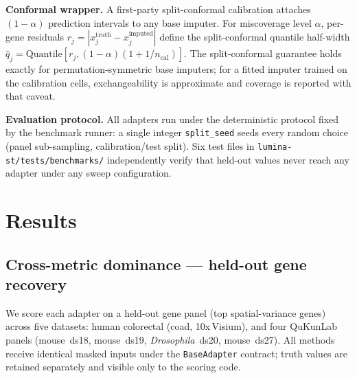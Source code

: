 \documentclass[10pt,letterpaper]{article}
\begin{document}
\textbf{Conformal wrapper.} A first-party split-conformal calibration attaches
$(1-\alpha)$ prediction intervals to any base imputer. For miscoverage
level $\alpha$, per-gene residuals $r_j = |x_j^{\text{truth}} -
x_j^{\text{imputed}}|$ define the split-conformal quantile half-width
$\hat{q}_j = \mathrm{Quantile}\!\left[r_j, (1-\alpha)(1+1/n_{\text{cal}})\right].$
The split-conformal guarantee holds exactly for permutation-symmetric base
imputers; for a fitted imputer trained on the calibration cells, exchangeability
is approximate and coverage is reported with that caveat.

\textbf{Evaluation protocol.} All adapters run under the deterministic protocol fixed
by the benchmark runner: a single integer \texttt{split\_seed} seeds every random
choice (panel sub-sampling, calibration/test split). Six test files in
\texttt{lumina-st/tests/benchmarks/} independently verify that held-out values never
reach any adapter under any sweep configuration.

\section{Results}
\label{sec:results}

\subsection{Cross-metric dominance --- held-out gene recovery}
\label{sec:res-dominance}

We score each adapter on a held-out gene panel (top spatial-variance genes) across
five datasets: human colorectal (coad, 10x\,Visium), and four QuKunLab panels
(mouse~ds18, mouse~ds19, \textit{Drosophila}~ds20, mouse~ds27). All methods receive
identical masked inputs under the \texttt{BaseAdapter} contract;
truth values are retained separately and visible only to the scoring code.
\end{document}
